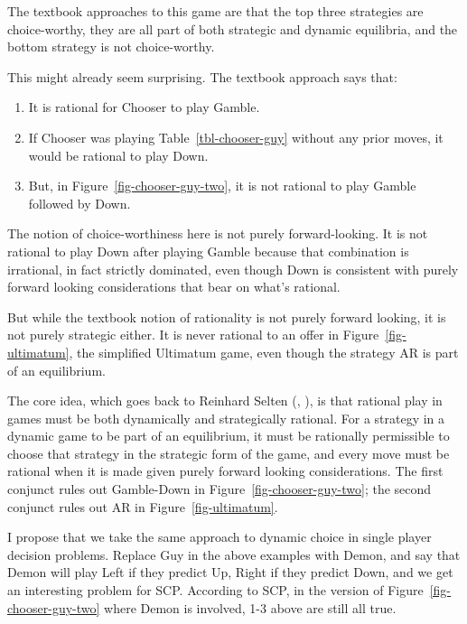 \documentclass[
  10pt,
  letterpaper,
  DIV=11,
  numbers=noendperiod,
  twoside]{scrartcl}
\providecommand{\tightlist}{%
  \setlength{\itemsep}{0pt}\setlength{\parskip}{0pt}}\usepackage{longtable,booktabs,array}
\begin{document}
The textbook approaches to this game are that the top three strategies
are choice-worthy, they are all part of both strategic and dynamic
equilibria, and the bottom strategy is not choice-worthy.

This might already seem surprising. The textbook approach says that:

\begin{enumerate}
\def\labelenumi{\arabic{enumi}.}
\tightlist
\item
  It is rational for Chooser to play Gamble.
\item
  If Chooser was playing Table~\ref{tbl-chooser-guy} without any prior
  moves, it would be rational to play Down.
\item
  But, in Figure~\ref{fig-chooser-guy-two}, it is not rational to play
  Gamble followed by Down.
\end{enumerate}

The notion of choice-worthiness here is not purely forward-looking. It
is not rational to play Down after playing Gamble because that
combination is irrational, in fact strictly dominated, even though Down
is consistent with purely forward looking considerations that bear on
what's rational.

But while the textbook notion of rationality is not purely forward
looking, it is not purely strategic either. It is never rational to an
offer in Figure~\ref{fig-ultimatum}, the simplified Ultimatum game, even
though the strategy AR is part of an equilibrium.

The core idea, which goes back to Reinhard Selten
(, ), is
that rational play in games must be both dynamically and strategically
rational. For a strategy in a dynamic game to be part of an equilibrium,
it must be rationally permissible to choose that strategy in the
strategic form of the game, and every move must be rational when it is
made given purely forward looking considerations. The first conjunct
rules out Gamble-Down in Figure~\ref{fig-chooser-guy-two}; the second
conjunct rules out AR in Figure~\ref{fig-ultimatum}.

I propose that we take the same approach to dynamic choice in single
player decision problems. Replace Guy in the above examples with Demon,
and say that Demon will play Left if they predict Up, Right if they
predict Down, and we get an interesting problem for SCP. According to
SCP, in the version of Figure~\ref{fig-chooser-guy-two} where Demon is
involved, 1-3 above are still all true.
\end{document}
